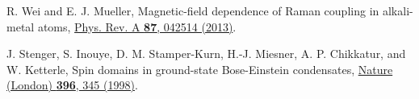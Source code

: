 \documentclass[twocolumn,prl,floatfix,citeautoscript,nofootinbib]{revtex4-1}
\begin{document}
\begin{thebibliography}{99}



 R. Wei and E. J. Mueller, {Magnetic-field dependence of
Raman coupling in alkali-metal atoms}, \href{https://doi.org/10.1103/PhysRevA.87.042514}%
{Phys. Rev. A \textbf{87}, 042514 (2013)}.


 J. Stenger, S. Inouye, D. M. Stamper-Kurn, H.-J.
Miesner, A. P. Chikkatur, and W. Ketterle, {Spin domains in ground-state
Bose-Einstein condensates}, \href{http://dx.doi.org/10.1038/24567}%
{Nature (London) \textbf{396}, 345 (1998)}.
\end{thebibliography}

\newpage \clearpage
\end{document}
